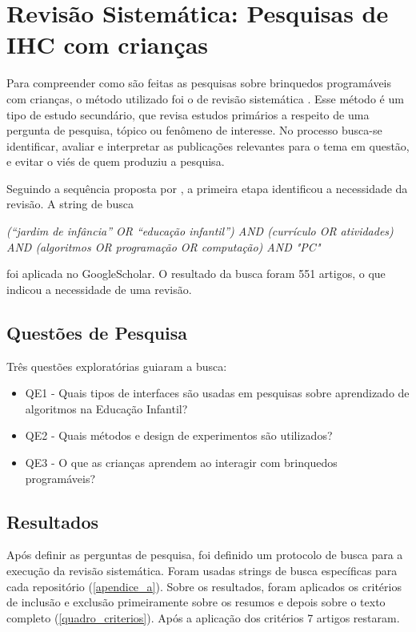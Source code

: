 {\section{Revisão Sistemática: Pesquisas de IHC com crianças}
\label{sec_rsl}
Para compreender como são feitas as pesquisas sobre brinquedos programáveis com crianças, o método utilizado foi o de revisão sistemática \cite{kitchenham_guidelines_2007}. Esse método é um tipo de estudo secundário, que revisa estudos primários a respeito de uma pergunta de pesquisa, tópico ou fenômeno de interesse. No processo busca-se identificar, avaliar e interpretar as publicações relevantes para o tema em questão, e evitar o viés de quem produziu a pesquisa.

Seguindo a sequência proposta por , a primeira etapa identificou a necessidade da revisão. A string de busca 

\textit
{
    (“jardim de infância” OR “educação infantil”) AND (currículo OR atividades) AND (algoritmos OR programação OR computação) AND "\acl{PC}"
}

foi aplicada no GoogleScholar. O resultado da busca foram 551 artigos, o que indicou a necessidade de uma revisão.

\subsection{Questões de Pesquisa}
Três questões exploratórias guiaram a busca:

\begin{itemize}
    \item QE1 - Quais tipos de interfaces são usadas em pesquisas sobre aprendizado de algoritmos na Educação Infantil? 
    \item QE2 - Quais métodos e design de experimentos são utilizados?
    \item QE3 - O que as crianças aprendem ao interagir com brinquedos programáveis?
\end{itemize}

\subsection{Resultados}

Após definir as perguntas de pesquisa, foi definido um protocolo de busca para a execução da revisão sistemática. Foram usadas strings de busca específicas para cada repositório (\autoref{apendice_a}). Sobre os resultados, foram aplicados os critérios de inclusão e exclusão primeiramente sobre os resumos e depois sobre o texto completo (\autoref{quadro_criterios}). Após a aplicação dos critérios 7 artigos restaram.

}
